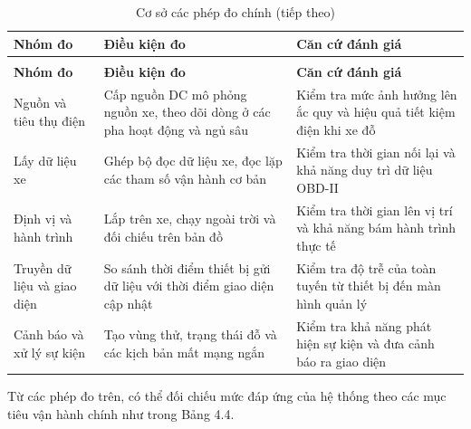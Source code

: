 \documentclass[a4paper]{extarticle}
\newcommand{\thesissettableid}[2]{%
  \renewcommand{\thetable}{#1}%
  \renewcommand{\theHtable}{#2}%
}
\begin{document}
{\thesissettableid{4.3}{condensed-r2-bang-4-3-co-so-cac-phep-do-chinh}
\def\LTcaptype{table}
\begin{longtable}{|L{(\linewidth - 4\tabcolsep) * }|L{(\linewidth - 4\tabcolsep) * }|L{(\linewidth - 4\tabcolsep) * }|}
\caption{Cơ sở các phép đo chính}\label{tab:condensed-r2-bang-4-3-co-so-cac-phep-do-chinh}\\
\hline
\textbf{Nhóm đo} & \textbf{Điều kiện đo} & \textbf{Căn cứ đánh giá} \\
\hline
\endfirsthead
\caption[]{Cơ sở các phép đo chính (tiếp theo)}\\
\hline
\textbf{Nhóm đo} & \textbf{Điều kiện đo} & \textbf{Căn cứ đánh giá} \\
\hline
\endhead
\endfoot
\endlastfoot
Nguồn và tiêu thụ điện & Cấp nguồn DC mô phỏng nguồn xe, theo dõi dòng ở các pha hoạt động và ngủ sâu & Kiểm tra mức ảnh hưởng lên ắc quy và hiệu quả tiết kiệm điện khi xe đỗ \\\hline
Lấy dữ liệu xe & Ghép bộ đọc dữ liệu xe, đọc lặp các tham số vận hành cơ bản & Kiểm tra thời gian nối lại và khả năng duy trì dữ liệu OBD-II \\\hline
Định vị và hành trình & Lắp trên xe, chạy ngoài trời và đối chiếu trên bản đồ & Kiểm tra thời gian lên vị trí và khả năng bám hành trình thực tế \\\hline
Truyền dữ liệu và giao diện & So sánh thời điểm thiết bị gửi dữ liệu với thời điểm giao diện cập nhật & Kiểm tra độ trễ của toàn tuyến từ thiết bị đến màn hình quản lý \\\hline
Cảnh báo và xử lý sự kiện & Tạo vùng thử, trạng thái đỗ và các kịch bản mất mạng ngắn & Kiểm tra khả năng phát hiện sự kiện và đưa cảnh báo ra giao diện \\\hline
\end{longtable}
}
Từ các phép đo trên, có thể đối chiếu mức đáp ứng của hệ thống theo các mục tiêu vận hành chính như trong Bảng 4.4.
\end{document}
